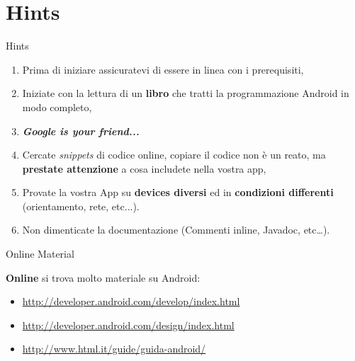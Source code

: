 \documentclass[xcolor=svgnames,11pt]{beamer}
\begin{document}
\section{Hints}

\begin{frame}{Hints}
\pause
\begin{enumerate}
\item Prima di iniziare assicuratevi di essere in linea con i prerequisiti,
\pause
\item Iniziate con la lettura di un \textbf{libro} che tratti la programmazione Android in modo completo,
\pause
\item \textbf{\emph{Google is your friend...}}
\pause
\item Cercate \textit{snippets} di codice online, copiare il codice non \`e un reato, ma \textbf{prestate attenzione} a cosa includete nella vostra app,
\pause
\item Provate la vostra App su \textbf{devices diversi} ed in \textbf{condizioni differenti} (orientamento, rete, etc...).
\pause
\item Non dimenticate la documentazione (Commenti inline, Javadoc, etc\ldots).
\end{enumerate}
\end{frame}

\begin{frame}{Online Material}

\textbf{Online} si trova molto materiale su Android:
\pause
\medskip
\begin{itemize}
\item \small{\url{http://developer.android.com/develop/index.html}}
\pause
\item \url{http://developer.android.com/design/index.html}
\pause
\item \url{http://www.html.it/guide/guida-android/}
\end{itemize}
\end{frame}
\end{document}
